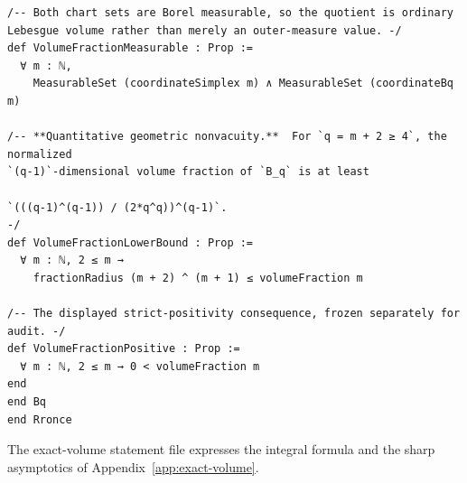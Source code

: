 \documentclass[11pt]{article}
\theoremstyle{definition}
\theoremstyle{remark}
\begin{document}
\begin{lstlisting}
/-- Both chart sets are Borel measurable, so the quotient is ordinary
Lebesgue volume rather than merely an outer-measure value. -/
def VolumeFractionMeasurable : Prop :=
  ∀ m : ℕ,
    MeasurableSet (coordinateSimplex m) ∧ MeasurableSet (coordinateBq m)

/-- **Quantitative geometric nonvacuity.**  For `q = m + 2 ≥ 4`, the normalized
`(q-1)`-dimensional volume fraction of `B_q` is at least

`(((q-1)^(q-1)) / (2*q^q))^(q-1)`.
-/
def VolumeFractionLowerBound : Prop :=
  ∀ m : ℕ, 2 ≤ m →
    fractionRadius (m + 2) ^ (m + 1) ≤ volumeFraction m

/-- The displayed strict-positivity consequence, frozen separately for audit. -/
def VolumeFractionPositive : Prop :=
  ∀ m : ℕ, 2 ≤ m → 0 < volumeFraction m
end
end Bq
end Rronce
\end{lstlisting}

The exact-volume statement file expresses the integral formula and the
sharp asymptotics of Appendix~\ref{app:exact-volume}.
\end{document}
